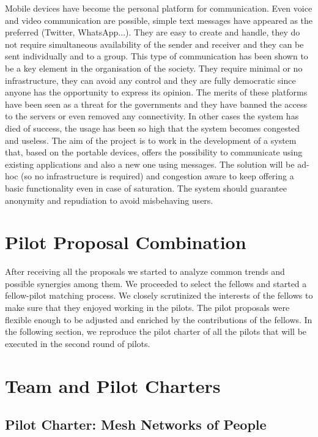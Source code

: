 \documentclass[draftclsnofoot,12pt,journal,onecolumn]{IEEEtran}
\begin{document}
Mobile devices have become the personal platform for communication. Even
voice and video communication are possible, simple text messages have
appeared as the preferred (Twitter, WhatsApp...). They are easy to create and
handle, they do not require simultaneous availability of the sender and
receiver and they can be sent individually and to a group.
This type of communication has been shown to be a key element in the
organisation of the society. They require minimal or no infrastructure, they
can avoid any control and they are fully democratic since anyone has the
opportunity to express its opinion.  The merits of these platforms have been
seen as a threat for the governments and they have banned the access to the
servers or even removed any connectivity. In other cases the system has died
of success, the usage has been so high that the system becomes congested and
useless.
The aim of the project is to work in the development of a system that, based
on the portable devices, offers the possibility to communicate using existing
applications and also a new one using messages. The solution will be ad-hoc
(so no infrastructure is required) and congestion aware to keep offering a
basic functionality even in case of saturation. The system should guarantee
anonymity and repudiation to avoid misbehaving users.

\section{Pilot Proposal Combination}
\label{sec:merging}

After receiving all the proposals we started to analyze common trends and possible synergies among them.
We proceeded to select the fellows and started a fellow-pilot matching process.
We closely scrutinized the interests of the fellows to make sure that they enjoyed working in the pilots.
The pilot proposals were flexible enough to be adjusted and enriched by the contributions of the fellows.
In the following section, we reproduce the pilot charter of all the pilots that will be executed in the second round of pilots.

\section{Team and Pilot Charters}
\label{sec:charters}

\subsection{Pilot Charter: Mesh Networks of People}
\label{sec:mnp}
\end{document}
